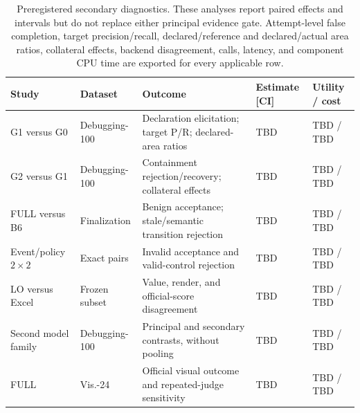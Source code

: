 \begin{table}[t]
\caption{Preregistered secondary diagnostics. These analyses report paired
effects and intervals but do not replace either principal evidence gate.
Attempt-level false completion, target precision/recall, declared/reference and
declared/actual area ratios, collateral effects, backend disagreement, calls,
latency, and component CPU time are exported for every applicable row.}
\label{tab:secondary}
\centering
\begingroup
\footnotesize
\setlength{\tabcolsep}{2.7pt}
\renewcommand{\arraystretch}{1.08}
\newcommand{\tbdsecondary}{\textcolor{BrickRed}{TBD}}
\begin{tabular}{@{}
  >{\raggedright\arraybackslash}p{2.00cm}
  >{\raggedright\arraybackslash}p{1.70cm}
  >{\raggedright\arraybackslash}p{4.30cm}
  >{\centering\arraybackslash}p{1.75cm}
  >{\centering\arraybackslash}p{2.55cm}@{}}
\toprule
\textbf{Study} & \textbf{Dataset} & \textbf{Outcome} &
\textbf{Estimate [CI]} & \textbf{Utility / cost} \\
\midrule
G1 versus G0 & Debugging-100 & Declaration elicitation; target P/R; declared-area ratios & \tbdsecondary & \tbdsecondary{} / \tbdsecondary \\
G2 versus G1 & Debugging-100 & Containment rejection/recovery; collateral effects & \tbdsecondary & \tbdsecondary{} / \tbdsecondary \\
FULL versus B6 & Finalization & Benign acceptance; stale/semantic transition rejection & \tbdsecondary & \tbdsecondary{} / \tbdsecondary \\
Event/policy $2\times2$ & Exact pairs & Invalid acceptance and valid-control rejection & \tbdsecondary & \tbdsecondary{} / \tbdsecondary \\
LO versus Excel & Frozen subset & Value, render, and official-score disagreement & \tbdsecondary & \tbdsecondary{} / \tbdsecondary \\
Second model family & Debugging-100 & Principal and secondary contrasts, without pooling & \tbdsecondary & \tbdsecondary{} / \tbdsecondary \\
FULL & Vis.-24 & Official visual outcome and repeated-judge sensitivity & \tbdsecondary & \tbdsecondary{} / \tbdsecondary \\
\bottomrule
\end{tabular}
\endgroup
\end{table}
